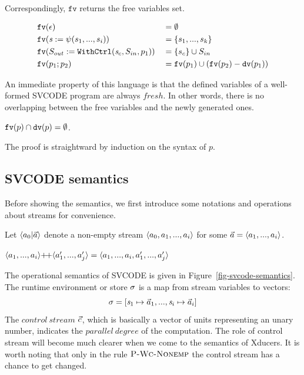Correspondingly, $\texttt{fv}$ returns the free variables set.

\begin{alignat*}{2}
&\mathtt{fv}(\epsilon) && = \emptyset \\
&\mathtt{fv}(\mathit{s} := \psi(s_1,...,s_i)) && = \{s_1,...,s_k\}\\
&\mathtt{fv}(S_{out} := \mathtt{WithCtrl}(\mathit{s}_c,S_{in},p_1)) && = \{s_c\} \cup S_{in} \\
&\mathtt{fv}(p_1;p_2) && = \mathtt{fv}(p_1) \cup (\mathtt{fv}(p_2) - \mathtt{dv}(p_1)) \\
\end{alignat*}


An immediate property of this language is that the defined variables of a well-formed SVCODE program are always $fresh$. In other words, there is no overlapping between the free variables and the newly generated ones.
\begin{lem}
	$\mathtt{fv}(p) \cap \mathtt{dv}(p) = \emptyset $. 
\end{lem}

The proof is straightward by induction on the syntax of $p$.



\subsection{SVCODE semantics}

Before showing the semantics, we first introduce some notations and operations about streams for convenience.
\begin{nota}
	Let $\< a_0 | \a \'>$ denote a non-empty stream $\< a_0,a_1,...,a_i \'>$ for some $\a = \< a_1,...,a_i \'>$. 
\end{nota}


\begin{nota}
$\vapp{\vrange{a_1}{a_i}} {\vrange{a_1'}{a_j'}} = \langle a_1,...,a_i,a_1',...,a_j' \rangle $ \\
	
\end{nota}

The operational semantics of SVCODE is given in Figure~\ref{fig-svcode-semantics}.
The runtime environment or store $\sigma$ is a map from stream variables to vectors:
 $$\sgm = [\s_1 \|-> {\a_1},...,\s_i \|-> {\a_i}]$$
The $control \ stream$ $\vec c$, which is basically a vector of units representing an unary number, indicates the $parallel \ degree$ of the computation. The role of control stream will become much clearer when we come to the semantics of Xducers. It is worth noting that only in the rule $\textsc{P-Wc-Nonemp}$ the control stream has a chance to get changed.

